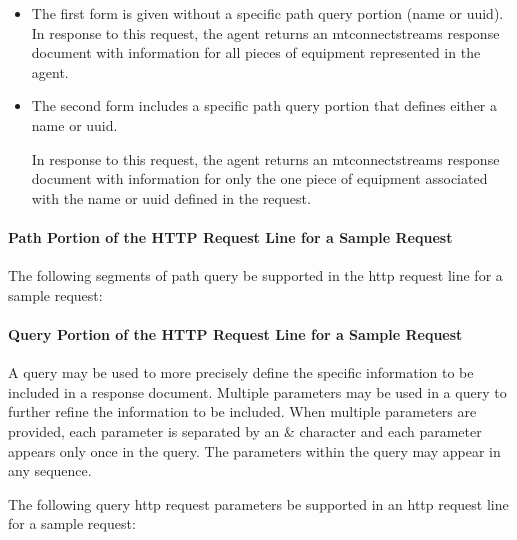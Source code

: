 \begin{itemize}
\item The first form is given without a specific \gls{path query} portion (\gls{name} or \gls{uuid}).  In response to this \gls{request}, the \gls{agent} returns an \gls{mtconnectstreams response document} with information for all pieces of equipment represented in the \gls{agent}.


\item The second form includes a specific \gls{path query} portion that defines either a \gls{name} or \gls{uuid}.

In response to this \gls{request}, the \gls{agent} returns an \gls{mtconnectstreams response document} with information for only the one piece of equipment associated with the \gls{name} or \gls{uuid} defined in the \gls{request}.

\end{itemize}

\paragraph{Path Portion of the HTTP Request Line for a Sample Request}\mbox{}

The following segments of \gls{path query} \MUST be supported in the \gls{http request line} for a \gls{sample request}:



\paragraph{Query Portion of the HTTP Request Line for a Sample Request}\mbox{}
\label{sec:Query Portion of the HTTP Request Line for a Sample Request}

A \gls{query} may be used to more precisely define the specific information to be included in a \gls{response document}.   Multiple parameters may be used in a \gls{query} to further refine the information to be included.   When multiple parameters are provided, each parameter is separated by an \& character and each parameter appears only once in the \gls{query}.  The parameters within the \gls{query} may appear in any sequence.

The following \gls{query http request} parameters \MUST be supported in an \gls{http request line} for a \gls{sample request}:

